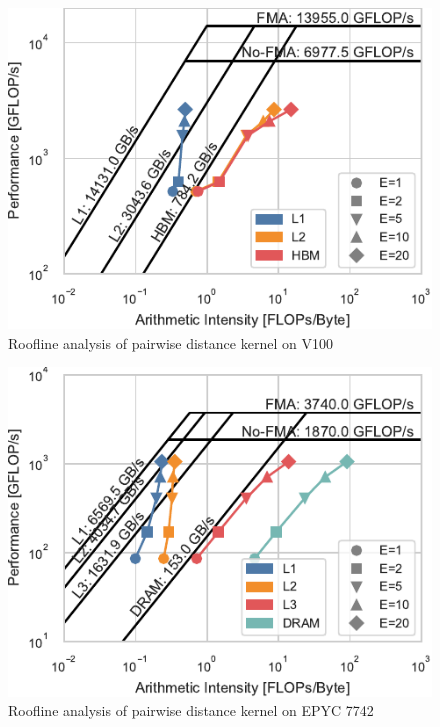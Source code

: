 \documentclass[conference]{IEEEtran}
\begin{document}
\begin{figure}
    \centering
    \includegraphics{figs/roofline_distances_v100}
    \caption{Roofline analysis of pairwise distance kernel on V100}%
    \label{fig:architecture}
\end{figure}

\begin{figure}
    \centering
    \includegraphics{figs/roofline_distances_epyc}
    \caption{Roofline analysis of pairwise distance kernel on EPYC 7742}%
    \label{fig:architecture}
\end{figure}
\end{document}
